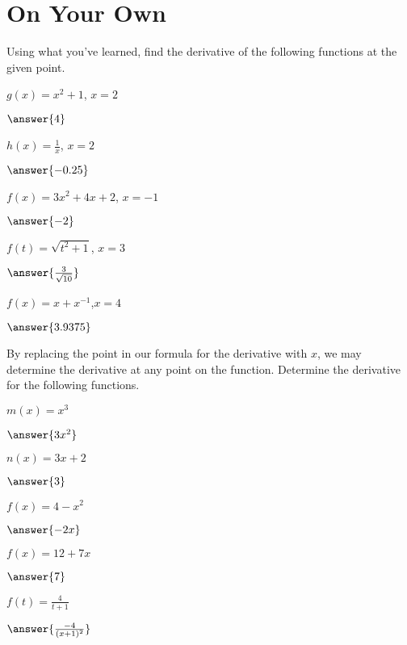 \documentclass{ximera}
\begin{document}
\section{On Your Own}
Using what you've learned, find the derivative of the following functions at the given point.
\setcounter{problem}{0}
\begin{question}
$g(x) = x^2+1$, $x=2$

$\answer{4}$

$h(x) = \frac{1}{x}$, $x=2$

$\answer{-0.25}$

$f(x)=3x^2+4x+2$, $x=-1$

$\answer{-2}$

$f(t)=\sqrt{t^2+1}$, $x=3$

$\answer{\frac{3}{\sqrt{10}}}$

$f(x) = x+x^{-1}$,$x=4$

$\answer{3.9375}$

\end{question}

By replacing the point in our formula for the derivative with $x$, we may determine the derivative at any point on the function. Determine the derivative for the following functions.
\begin{question}
$m(x) = x^3$

$\answer{3x^2}$

$n(x) = 3x+2$

$\answer{3}$

$f(x)=4-x^2$

$\answer{-2x}$

$f(x) = 12+7x$

$\answer{7}$

$f(t)=\frac{4}{t+1}$

$\answer{\frac{-4}{(x+1)^2}}$

\end{question}
\end{document}
